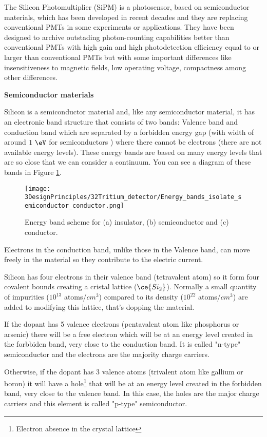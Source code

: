 The Silicon Photomultiplier (SiPM) is a photosensor, based on semiconductor materials, which has been developed in recent decades and they are replacing conventional PMTs in some experiments or applications. They have been designed to archive outstading photon-counting capabilities better than conventional PMTs with high gain and high photodetection efficiency equal to or larger than conventional PMTs but with some important differences like insensitiveness to magnetic fields, low operating voltage, compactness among other differences.

\textbf{Semiconductor materials} 

Silicon is a semiconductor material and, like any semiconductor material, it has an electronic band structure that consists of two bands: Valence band and conduction band which are separated by a forbidden energy gap (with width of around $1~\eV$ for semiconductors \cite{Leo}) where there cannot be electrons (there are not available energy levels). These energy bands are based on many energy levels that are so close that we can consider a continuum. You can see a diagram of these bands in Figure \ref{fig:EnergyBandsSC}.

\begin{figure}[htbp]
\centering
\texttt{[image: 3DesignPrinciples/32Tritium\_detector/Energy\_bands\_isolate\_semiconductor\_conductor.png]}
\caption{Energy band scheme for (a) insulator, (b) semiconductor and (c) conductor.\label{fig:EnergyBandsSC}~\cite{Leo}}
\end{figure}

Electrons in the conduction band, unlike those in the Valence band, can move freely in the material so they contribute to the electric current. 

Silicon has four electrons in their valence band (tetravalent atom) so it form four covalent bounds creating a cristal lattice ($\ce{Si_2}$). Normally a small quantity of impurities ($10^{13}$ atoms/$cm^3$) compared to its density ($10^{22}$ atoms/$cm^3$) are added to modifying this lattice, that's dopping the material. 

If the dopant has 5 valence electrons (pentavalent atom like phosphorus or arsenic) there will be a free electron which will be at an energy level created in the forbbiden band, very close to the conduction band. It is called "n-type" semiconductor and the electrons are the majority charge carriers.

Otherwise, if the dopant has 3 valence atoms (trivalent atom like gallium or boron) it will have a hole\footnote{Electron absence in the crystal lattice} that will be at an energy level created in the forbidden band, very close to the valence band. In this case, the holes are the major charge carriers and this element is called "p-type" semiconductor.

